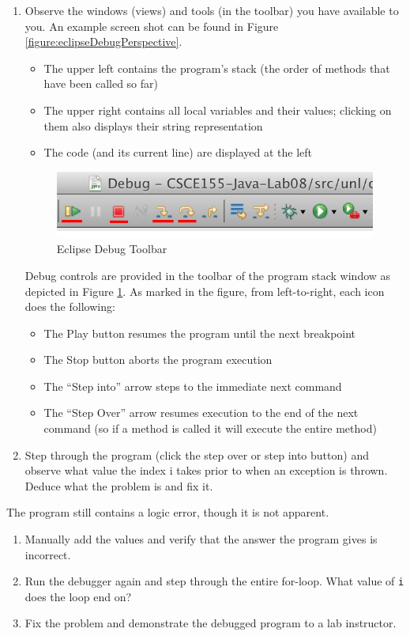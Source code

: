 \documentclass[12pt]{scrartcl}
\begin{document}
\begin{enumerate}
  \item Observe the windows (views) and tools (in the toolbar) you have available to you.
	An example screen shot can be found in Figure \ref{figure:eclipseDebugPerspective}.
	\begin{itemize}
	  \item The upper left contains the program's stack (the order of methods that 
	  	have been called so far)
	  \item The upper right contains all local variables and their values; clicking on 
		them also displays their string representation
	  \item The code (and its current line) are displayed at the left
	\end{itemize}
\begin{figure}[h]
\centering
\includegraphics[scale=1.0]{eclipseDebugToolbarMarkUp}
\caption{Eclipse Debug Toolbar}
\label{figure:eclipseDebugToolbar}
\end{figure}
	Debug controls are provided in the toolbar of the program stack window as 
	depicted in Figure \ref{figure:eclipseDebugToolbar}.  As marked in the figure, 
	from left-to-right, each icon does the following:
	\begin{itemize}
	  \item The Play button resumes the program until the next breakpoint
	  \item The Stop button aborts the program execution
	  \item The ``Step into'' arrow steps to the immediate next command
	  \item The ``Step Over'' arrow resumes execution to the end of the next 
		command (so if a method is called it will execute the entire method)
	\end{itemize}	  
  \item Step through the program (click the step over or step into button) and 
  	observe what value the index i takes prior to when an exception is thrown.  
	Deduce what the problem is and fix it.
\end{enumerate}
	

The program still contains a logic error, though it is not apparent.  
\begin{enumerate}
  \item Manually add the values and verify that the answer the program gives 
	is incorrect.
  \item Run the debugger again and step through the entire for-loop.  What 
	value of \texttt{i} does the loop end on? 
  \item Fix the problem and demonstrate the debugged program to a lab instructor.
\end{enumerate}
\end{document}
